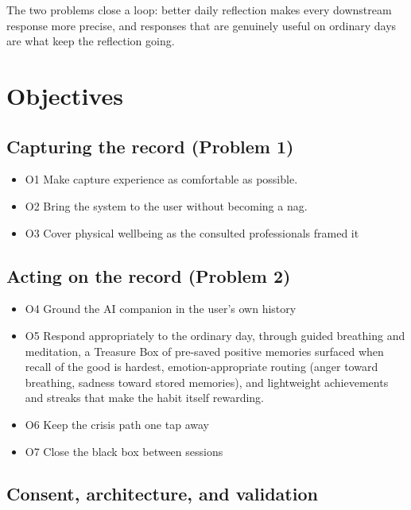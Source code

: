 The two problems close a loop: better daily reflection makes every downstream response
more precise, and responses that are genuinely useful on ordinary days are what keep the
reflection going.

\section{Objectives}
\label{sec:objectives}


\subsection*{Capturing the record (Problem 1)}

\begin{itemize}
  \item O1 Make capture experience as comfortable as possible.

  \item O2 Bring the system to the user without becoming a nag.

  \item O3 Cover physical wellbeing as the consulted professionals framed
    it
\end{itemize}

\subsection*{Acting on the record (Problem 2)}

\begin{itemize}
  \item O4 Ground the AI companion in the user's own history

  \item O5 Respond appropriately to the ordinary day, through
    guided breathing and meditation, a Treasure Box of pre-saved positive
    memories surfaced when recall of the good is hardest, emotion-appropriate
    routing (anger toward breathing, sadness toward stored memories), and
    lightweight achievements and streaks that make the habit itself rewarding.

  \item O6 Keep the crisis path one tap away

  \item O7 Close the black box between sessions
\end{itemize}

\subsection*{Consent, architecture, and validation}

